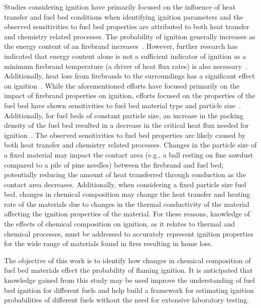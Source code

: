     Studies considering ignition have primarily focused on the influence of heat transfer and fuel bed conditions when identifying ignition parameters and the observed sensitivities to fuel bed properties are attributed to both heat transfer and chemistry related processes. The probability of ignition generally increases as the energy content of an firebrand increases~\cite{Hadden2011}. However, further research has indicated that energy content alone is not a sufficient indicator of ignition as a minimum firebrand temperature (a driver of heat flux rates) is also necessary~\cite{Zak2014}. Additionally, heat loss from firebrands to the surroundings has a significant effect on ignition~\cite{Fernandez-Pello2015}. While the aforementioned efforts have focused primarily on the impact of firebrand properties on ignition, efforts focused on the properties of the fuel bed have shown sensitivities to fuel bed material type and particle size~\cite{Urban2018}. Additionally, for fuel beds of constant particle size, an increase in the packing density of the fuel bed resulted in a decrease in the critical heat flux needed for ignition~\cite{Mindykowski2011, Hernandez2017, Rivera2020}. The observed sensitivities to fuel bed properties are likely caused by both heat transfer and chemistry related processes. Changes in the particle size of a fixed material may impact the contact area (e.g., a ball resting on fine sawdust compared to a pile of pine needles) between the firebrand and fuel bed; potentially reducing the amount of heat transferred through conduction as the contact area decreases. Additionally, when considering a fixed particle size fuel bed, changes in chemical composition may change the heat transfer and heating rate of the materials due to changes in the thermal conductivity of the material affecting the ignition properties of the material. For these reasons, knowledge of the effects of chemical composition on ignition, as it relates to thermal and chemical processes, must be addressed to accurately represent ignition properties for the wide range of materials found in fires resulting in home loss.
  
    The objective of this work is to identify how changes in chemical composition of fuel bed materials effect the probability of flaming ignition. It is anticipated that knowledge gained from this study may be used improve the understanding of fuel bed ignition for different fuels and help build a framework for estimating ignition probabilities of different fuels without the need for extensive laboratory testing.



